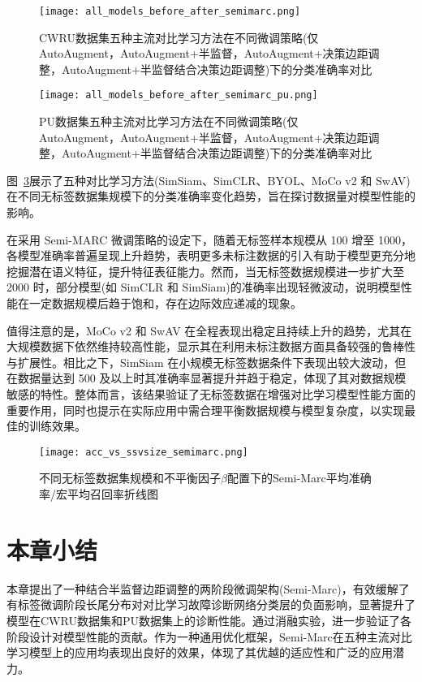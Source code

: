 \documentclass[master]{thesis-uestc}
\begin{document}
\begin{figure}[H]
    \centering
    \texttt{[image: all\_models\_before\_after\_semimarc.png]}
    \caption{CWRU数据集五种主流对比学习方法在不同微调策略(仅 AutoAugment，AutoAugment+半监督，AutoAugment+决策边距调整，AutoAugment+半监督结合决策边距调整)下的分类准确率对比}
    \label{fig:all_models_before_after_semimarc}
\end{figure}

\begin{figure}[H]
    \centering
    \texttt{[image: all\_models\_before\_after\_semimarc\_pu.png]}
    \caption{PU数据集五种主流对比学习方法在不同微调策略(仅 AutoAugment，AutoAugment+半监督，AutoAugment+决策边距调整，AutoAugment+半监督结合决策边距调整)下的分类准确率对比}
    \label{fig:all_models_before_after_semimarc_pu}
\end{figure}
图~\ref{acc_vs_ssvsize_semimarc}展示了五种对比学习方法(SimSiam、SimCLR、BYOL、MoCo v2 和 SwAV)在不同无标签数据集规模下的分类准确率变化趋势，旨在探讨数据量对模型性能的影响。

在采用 Semi-MARC 微调策略的设定下，随着无标签样本规模从 100 增至 1000，各模型准确率普遍呈现上升趋势，表明更多未标注数据的引入有助于模型更充分地挖掘潜在语义特征，提升特征表征能力。然而，当无标签数据规模进一步扩大至 2000 时，部分模型(如 SimCLR 和 SimSiam)的准确率出现轻微波动，说明模型性能在一定数据规模后趋于饱和，存在边际效应递减的现象。

值得注意的是，MoCo v2 和 SwAV 在全程表现出稳定且持续上升的趋势，尤其在大规模数据下依然维持较高性能，显示其在利用未标注数据方面具备较强的鲁棒性与扩展性。相比之下，SimSiam 在小规模无标签数据条件下表现出较大波动，但在数据量达到 500 及以上时其准确率显著提升并趋于稳定，体现了其对数据规模敏感的特性。整体而言，该结果验证了无标签数据在增强对比学习模型性能方面的重要作用，同时也提示在实际应用中需合理平衡数据规模与模型复杂度，以实现最佳的训练效果。


\begin{figure}[H]
    \centering
    \texttt{[image: acc\_vs\_ssvsize\_semimarc.png]}
    \caption{不同无标签数据集规模和不平衡因子$\beta$配置下的Semi-Marc平均准确率/宏平均召回率折线图}
    \label{acc_vs_ssvsize_semimarc}
\end{figure}

\FloatBarrier  %
\section{本章小结}
本章提出了一种结合半监督边距调整的两阶段微调架构(Semi-Marc)，有效缓解了有标签微调阶段长尾分布对对比学习故障诊断网络分类层的负面影响，显著提升了模型在CWRU数据集和PU数据集上的诊断性能。通过消融实验，进一步验证了各阶段设计对模型性能的贡献。作为一种通用优化框架，Semi-Marc在五种主流对比学习模型上的应用均表现出良好的效果，体现了其优越的适应性和广泛的应用潜力。
\end{document}

